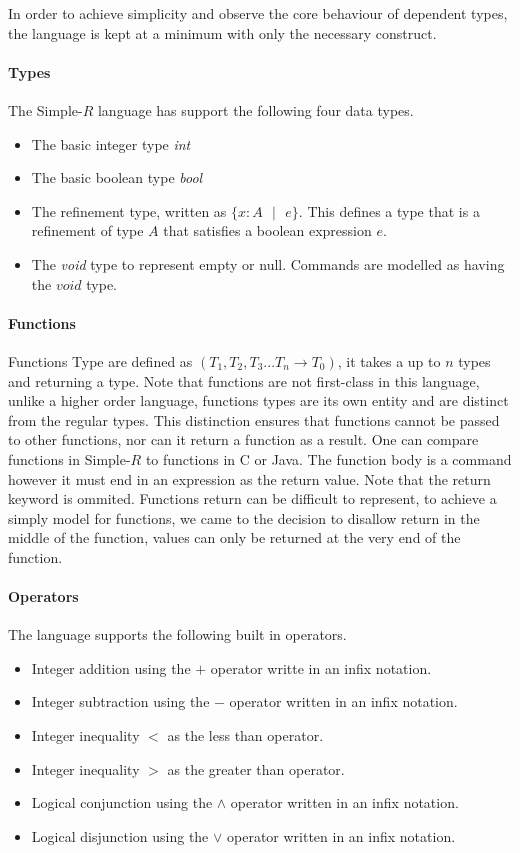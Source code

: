 \documentclass[a4paper,12pt]{report}
\begin{document}
\par
In order to achieve simplicity and observe the core behaviour of dependent 
types, the language is kept at a minimum with only the necessary construct. 

\paragraph{Types} The Simple-$R$ language has support the following four data types. 
\begin{itemize}
  \item The basic integer type \textit{int}
  \item The basic boolean type \textit{bool}
  \item The refinement type, written as $\{x: A\text{ }|\text{ }e\}$. This defines 
  a type that is a refinement of type $A$ that satisfies a boolean expression $e$.
  \item The \textit{void} type to represent empty or null. Commands are modelled 
  as having the $void$ type.
\end{itemize}

\paragraph{Functions}
Functions Type are defined as $(T_1, T_2,T_3...T_n \longrightarrow T_0)$, 
it takes a up to $n$ types and returning a type. Note that functions are 
not first-class in this language, unlike a higher order 
language, functions types are its own entity and are distinct from the regular 
types. This distinction ensures that functions cannot be passed to 
other functions, nor can it return a function as a result. One can compare 
functions in Simple-$R$ to functions in C or Java. The function body is a 
command however it must end in an expression as the return value. Note that the 
return keyword is ommited. Functions return can be difficult to represent, to achieve 
a simply model for functions, we came to the decision to disallow return in the 
middle of the function, values can only be returned at the very end of the 
function.

\paragraph{Operators}
The language supports the following built in operators.
\begin{itemize}
  \item Integer addition using the $+$ operator writte in an infix notation.
  \item Integer subtraction using the $-$ operator written in an infix notation.
  \item Integer inequality $<$ as the less than operator.
  \item Integer inequality $>$ as the greater than operator.
  \item Logical conjunction using the $\wedge$ operator written in an infix 
  notation.
  \item Logical disjunction using the $\vee$ operator written in an infix 
  notation.
\end{itemize}
\end{document}
